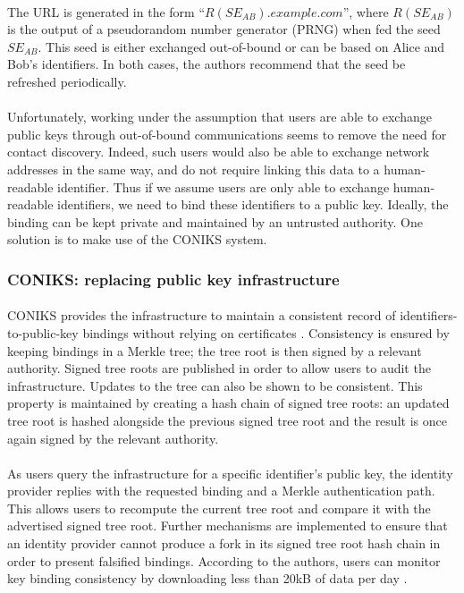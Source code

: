 \paragraph{} The URL is generated in the form ``$R(SE_{AB}).example.com$'', where $R(SE_{AB})$ is the output of a pseudorandom number generator (PRNG) when fed the seed $SE_{AB}$. This seed is either exchanged out-of-bound or can be based on Alice and Bob's identifiers. In both cases, the authors recommend that the seed be refreshed periodically.

\paragraph{} Unfortunately, working under the assumption that users are able to exchange public keys through out-of-bound communications seems to remove the need for contact discovery. Indeed, such users would also be able to exchange network addresses in the same way, and do not require linking this data to a human-readable identifier. Thus if we assume users are only able to exchange human-readable identifiers, we need to bind these identifiers to a public key. Ideally, the binding can be kept private and maintained by an untrusted authority. One solution is to make use of the CONIKS system.

\subsubsection{CONIKS: replacing public key infrastructure}

\paragraph{} CONIKS provides the infrastructure to maintain a consistent record of identifiers-to-public-key bindings without relying on certificates \cite{Melara2014}. Consistency is ensured by keeping bindings in a Merkle tree; the tree root is then signed by a relevant authority. Signed tree roots are published in order to allow users to audit the infrastructure. Updates to the tree can also be shown to be consistent. This property is maintained by creating a hash chain of signed tree roots: an updated tree root is hashed alongside the previous signed tree root and the result is once again signed by the relevant authority. 


\paragraph{} As users query the infrastructure for a specific identifier's public key, the identity provider replies with the requested binding and a Merkle authentication path. This allows users to recompute the current tree root and compare it with the advertised signed tree root. Further mechanisms are implemented to ensure that an identity provider cannot produce a fork in its signed tree root hash chain in order to present falsified bindings. According to the authors, users can monitor key binding consistency by downloading less than 20kB of data per day \cite{Melara2014}.



